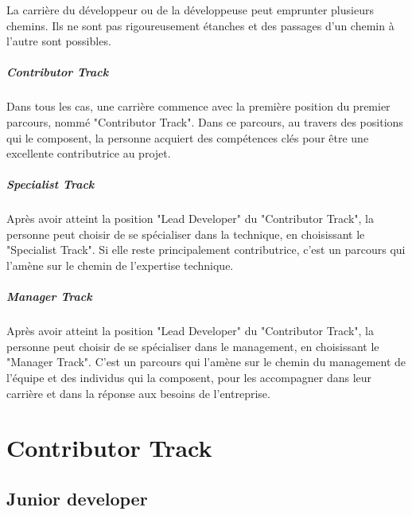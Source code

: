\documentclass[a4paper, french, openany, 12pt]{book}
\begin{document}
\begin{multicols}{2}

  La carrière du développeur ou de la développeuse peut emprunter plusieurs chemins.
  Ils ne sont pas rigoureusement étanches et des passages d'un chemin à l'autre sont possibles.

  \subsubsection*{Contributor Track}

  Dans tous les cas, une carrière commence avec la première position du premier parcours, nommé "Contributor Track".
  Dans ce parcours, au travers des positions qui le composent, la personne acquiert des compétences clés pour être une
  excellente contributrice au projet.

  \subsubsection*{Specialist Track}

  Après avoir atteint la position "Lead Developer" du "Contributor Track", la personne peut choisir de se spécialiser dans
  la technique, en choisissant le "Specialist Track".
  Si elle reste principalement contributrice, c'est un parcours qui l'amène sur le chemin de l'expertise technique.

  \subsubsection*{Manager Track}

  Après avoir atteint la position "Lead Developer" du "Contributor Track", la personne peut choisir de se spécialiser dans
  le management, en choisissant le "Manager Track".
  C'est un parcours qui l'amène sur le chemin du management de l'équipe et des individus qui la composent, pour les
  accompagner dans leur carrière et dans la réponse aux besoins de l'entreprise.

\end{multicols}

\part{Contributor Track}

\chapter{Junior developer}
\end{document}
